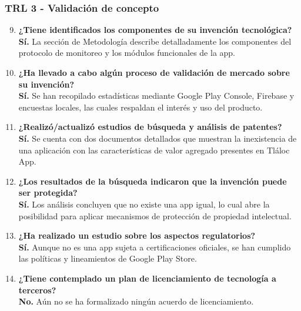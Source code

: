 \subsubsection*{TRL 3 - Validación de concepto}
\begin{enumerate}
    \setcounter{enumi}{8}
    \item \textbf{¿Tiene identificados los componentes de su invención tecnológica?} \\ \textbf{Sí.} La sección de Metodología describe detalladamente los componentes del protocolo de monitoreo y los módulos funcionales de la app.
    
    \item \textbf{¿Ha llevado a cabo algún proceso de validación de mercado sobre su invención?} \\ \textbf{Sí.} Se han recopilado estadísticas mediante Google Play Console, Firebase y encuestas locales, las cuales respaldan el interés y uso del producto.
    
    \item \textbf{¿Realizó/actualizó estudios de búsqueda y análisis de patentes?} \\ \textbf{Sí.} Se cuenta con dos documentos detallados que muestran la inexistencia de una aplicación con las características de valor agregado presentes en Tláloc App.
    
    \item \textbf{¿Los resultados de la búsqueda indicaron que la invención puede ser protegida?} \\ \textbf{Sí.} Los análisis concluyen que no existe una app igual, lo cual abre la posibilidad para aplicar mecanismos de protección de propiedad intelectual.
    
    \item \textbf{¿Ha realizado un estudio sobre los aspectos regulatorios?} \\ \textbf{Sí.} Aunque no es una app sujeta a certificaciones oficiales, se han cumplido las políticas y lineamientos de Google Play Store.
    
    \item \textbf{¿Tiene contemplado un plan de licenciamiento de tecnología a terceros?} \\ \textbf{No.} Aún no se ha formalizado ningún acuerdo de licenciamiento.
\end{enumerate}

